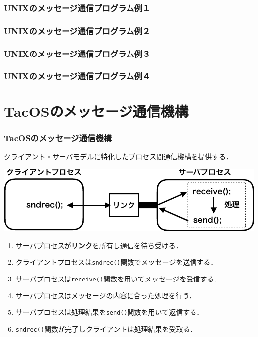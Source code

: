 \documentclass[dvipdfmx]{beamer}
\begin{document}
\begin{frame}
  \frametitle{UNIXのメッセージ通信プログラム例１}
  
  
\end{frame}

\begin{frame}
  \frametitle{UNIXのメッセージ通信プログラム例２}
  
\end{frame}

\begin{frame}
  \frametitle{UNIXのメッセージ通信プログラム例３}
  
\end{frame}

\begin{frame}
  \frametitle{UNIXのメッセージ通信プログラム例４}
  
  
\end{frame}

\section{TacOSのメッセージ通信機構}
\begin{frame}
  \frametitle{TacOSのメッセージ通信機構}
  クライアント・サーバモデルに特化したプロセス間通信機構を提供する．
  \begin{center}
    \includegraphics[scale=0.6]{Fig/tacosMessage-crop.pdf}
  \end{center}
  \begin{enumerate}
  \item サーバプロセスが{\bf リンク}を所有し通信を待ち受ける．
  \item クライアントプロセスは{\tt sndrec()}関数でメッセージを送信する．
  \item サーバプロセスは{\tt receive()}関数を用いてメッセージを受信する．
  \item サーバプロセスはメッセージの内容に合った処理を行う．
  \item サーバプロセスは処理結果を{\tt send()}関数を用いて返信する．
  \item {\tt sndrec()}関数が完了しクライアントは処理結果を受取る．
  \end{enumerate}
\end{frame}
\end{document}
